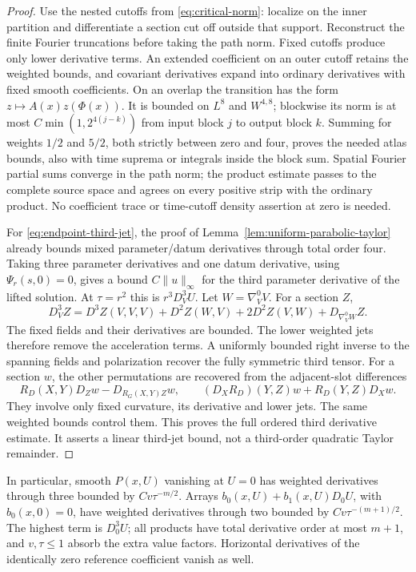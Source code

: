 \documentclass[11pt]{article}
\numberwithin{equation}{section}
\theoremstyle{definition}
\theoremstyle{remark}
\begin{document}
\begin{proof}
Use the nested cutoffs from \eqref{eq:critical-norm}:
localize on the inner partition and differentiate a
section cut off outside that support. Reconstruct the
finite Fourier truncations before taking the path norm.
Fixed cutoffs produce only lower derivative terms.
An extended coefficient on an outer cutoff retains
the weighted bounds, and covariant derivatives expand
into ordinary derivatives with fixed smooth coefficients.
On an overlap the transition has the form
\(z\mapsto A(x)z(\Phi(x))\). It is bounded on \(L^8\)
and \(W^{4,8}\); blockwise its norm is at most
\(C\min(1,2^{4(j-k)})\) from input block \(j\) to
output block \(k\). Summing for weights \(1/2\)
and \(5/2\), both strictly between zero and four,
proves the needed atlas bounds, also with time
suprema or integrals inside the block sum.
Spatial Fourier partial sums converge in the path
norm; the product estimate passes to the complete
source space and agrees on every positive strip with
the ordinary product. No coefficient trace or
time-cutoff density assertion at zero is needed.

For \eqref{eq:endpoint-third-jet}, the proof of
Lemma~\ref{lem:uniform-parabolic-taylor} already
bounds mixed parameter/datum derivatives through
total order four. Taking three parameter derivatives
and one datum derivative, using
\(\Psi_r(s,0)=0\), gives a bound \(C\|u\|_\infty\)
for the third parameter derivative of the lifted
solution. At \(\tau=r^2\) this is \(r^3D_V^3U\).
Let \(W=\nabla^0_VV\). For a section \(Z\),
\[
 D_V^3Z=D^3Z(V,V,V)+D^2Z(W,V)+2D^2Z(V,W)
                                      +D_{\nabla^0_VW}Z .
\]
The fixed fields and their derivatives are bounded.
The lower weighted jets therefore remove the acceleration
terms. A uniformly bounded right inverse to the spanning
fields and polarization recover the fully symmetric
third tensor. For a section \(w\), the other permutations
are recovered from the adjacent-slot differences
\[
 R_D(X,Y)D_Zw-D_{R_G(X,Y)Z}w,\qquad
 (D_XR_D)(Y,Z)w+R_D(Y,Z)D_Xw.
\]
They involve only fixed curvature, its derivative and
lower jets. The same weighted bounds control them.
This proves the full ordered third derivative estimate.
It asserts a linear third-jet bound, not a third-order
quadratic Taylor remainder.
\end{proof}

In particular, smooth \(P(x,U)\) vanishing at \(U=0\)
has weighted derivatives through three bounded by
\(Cv\tau^{-m/2}\). Arrays
\(b_0(x,U)+b_1(x,U)D_0U\), with \(b_0(x,0)=0\),
have weighted derivatives through two bounded by
\(Cv\tau^{-(m+1)/2}\). The highest term is
\(D_0^3U\); all products have total derivative order
at most \(m+1\), and \(v,\tau\le1\) absorb the
extra value factors. Horizontal derivatives of the
identically zero reference coefficient vanish as well.
\end{document}
